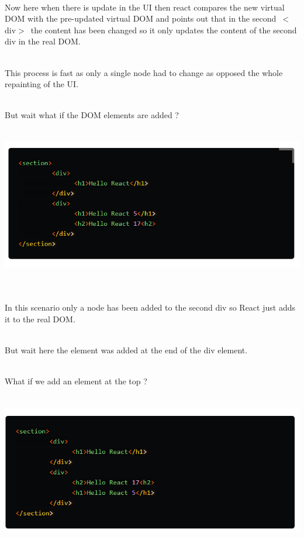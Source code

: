 \documentclass{article}
\begin{document}
\noindent 
{\bf }

\noindent 
{\bf }

\noindent 
\\
Now here when there is update in the UI then react compares the new virtual DOM with the pre-updated virtual DOM and points out that in the second~$\mathrm{<}$div$\mathrm{>}$~the content has been changed so it only updates the content of the second div in the real DOM.

\noindent 
\\
This process is fast as only a single node had to change as opposed the whole repainting of the UI.

\noindent 
\\
But wait what if the DOM elements are added ?

\noindent 
{\bf }

\noindent 
{\bf \includegraphics*[width=6.26in, height=2.68in]{IMG-06-02}}

\noindent 
{\bf }

\noindent 
{\bf }

\noindent 
\\
In this scenario only a node has been added to the second div so React just adds it to the real DOM.

\noindent 
\\
But wait here the element was added at the end of the div element.

\noindent 
\\
What if we add an element at the top ?

\noindent 
{\bf \includegraphics*[width=6.26in, height=2.65in]{IMG-06-03}}
\end{document}
